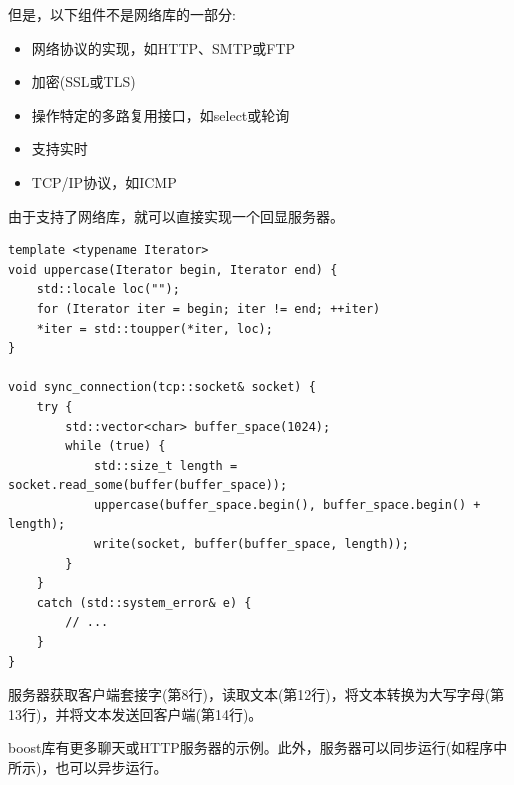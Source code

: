但是，以下组件不是网络库的一部分:

\begin{itemize}
\item 
网络协议的实现，如HTTP、SMTP或FTP

\item 
加密(SSL或TLS)

\item 
操作特定的多路复用接口，如select或轮询

\item 
支持实时

\item 
TCP/IP协议，如ICMP
\end{itemize}

由于支持了网络库，就可以直接实现一个回显服务器。

\begin{lstlisting}[style=styleCXX]
template <typename Iterator>
void uppercase(Iterator begin, Iterator end) {
	std::locale loc("");
	for (Iterator iter = begin; iter != end; ++iter)
	*iter = std::toupper(*iter, loc);
}

void sync_connection(tcp::socket& socket) {
	try {
		std::vector<char> buffer_space(1024);
		while (true) {
			std::size_t length = socket.read_some(buffer(buffer_space));
			uppercase(buffer_space.begin(), buffer_space.begin() + length);
			write(socket, buffer(buffer_space, length));
		}
	}
	catch (std::system_error& e) {
		// ...
	}
}
\end{lstlisting}

服务器获取客户端套接字(第8行)，读取文本(第12行)，将文本转换为大写字母(第13行)，并将文本发送回客户端(第14行)。

boost库有更多聊天或HTTP服务器的示例。此外，服务器可以同步运行(如程序中所示)，也可以异步运行。






















